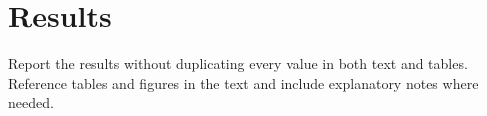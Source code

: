 \chapter{Results}

Report the results without duplicating every value in both text and tables.
Reference tables and figures in the text and include explanatory notes where
needed.
